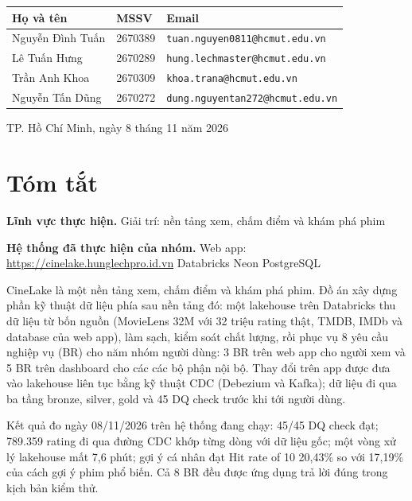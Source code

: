 \documentclass[a4paper,11pt]{article}
\newcommand{\reportdate}{ngày 8 tháng 11 năm 2026}
\begin{document}
\begin{titlepage}
  {\small
    \renewcommand{\arraystretch}{1.3}

    \begin{tabularx}{\textwidth}{
      @{}L{4.5cm}C{2.0cm}
      >{\RaggedRight\arraybackslash}X@{}
    }
      \hline
      \textbf{Họ và tên} & \textbf{MSSV} & \textbf{Email} \\
      \hline
      Nguyễn Đình Tuấn & 2670389 & \nolinkurl{tuan.nguyen0811@hcmut.edu.vn} \\
      Lê Tuấn Hưng & 2670289 & \nolinkurl{hung.lechmaster@hcmut.edu.vn} \\
      Trần Anh Khoa & 2670309 & \nolinkurl{khoa.trana@hcmut.edu.vn} \\
      Nguyễn Tấn Dũng & 2670272 & \nolinkurl{dung.nguyentan272@hcmut.edu.vn} \\
      \hline
    \end{tabularx}
  }

  \vfill
  {\large TP. Hồ Chí Minh, \reportdate\par}
\end{titlepage}

\hypersetup{pageanchor=true}
\section*{Tóm tắt}

\textbf{Lĩnh vực thực hiện.} Giải trí: nền tảng xem, chấm điểm và khám phá phim

\textbf{Hệ thống đã thực hiện của nhóm.} Web app: \url{https://cinelake.hunglechpro.id.vn} \textperiodcentered{} Databricks \textperiodcentered{} Neon PostgreSQL

CineLake là một nền tảng xem, chấm điểm và khám phá phim. Đồ án xây dựng phần kỹ thuật dữ liệu phía sau nền tảng đó: một lakehouse trên Databricks thu dữ liệu từ bốn nguồn (MovieLens 32M với 32 triệu rating thật, TMDB, IMDb và database của web app), làm sạch, kiểm soát chất lượng, rồi phục vụ 8 yêu cầu nghiệp vụ (BR) cho năm nhóm người dùng: 3 BR trên web app cho người xem và 5 BR trên dashboard cho các các bộ phận nội bộ. Thay đổi trên app được đưa vào lakehouse liên tục bằng kỹ thuật CDC (Debezium và Kafka); dữ liệu đi qua ba tầng bronze, silver, gold và 45 DQ check trước khi tới người dùng.

Kết quả đo ngày 08/11/2026 trên hệ thống đang chạy: 45/45 DQ check đạt; 789.359 rating đi qua đường CDC khớp từng dòng với dữ liệu gốc; một vòng xử lý lakehouse mất 7,6 phút; gợi ý cá nhân đạt Hit rate of 10 20,43\% so với 17,19\% của cách gợi ý phim phổ biến. Cả 8 BR đều được ứng dụng trả lời đúng trong kịch bản kiểm thử.
\end{document}
